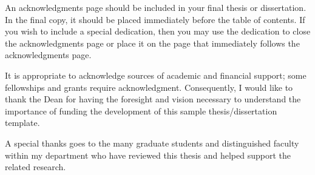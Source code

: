 \begin{singlespace}
\setcounter{page}{2}
\tableofcontents

\renewcommand{\listoftablespostscript}{

\textbf{Note:} Be consistent in aligning multi-lined table-names, figure-names,
and chapter/section-names throughout your document.  It is generally
recommended to make sure any additional lines (i.e., within a long title or a
long table name) wrap and align immediately under the 1st character of the
title or name with which they are associated in the line immediately above ---
as shown in the ``Table 2.1'' example above.   Whatever approach you take, be
consistent.}

\cleardoublepage
{}
{}
\listoffigures

\cleardoublepage
{}
{}
\listoftables
\end{singlespace}

\renewcommand{\thesisacknowledgmentpostscript}{
\textbf{Reminders of what needs to be updated:}
After removing these comments, use the above format to help input your
acknowledgments page.   A special dedication can be placed as the final
paragraph, as shown above; alternatively, you may include a special dedication
on the page that follows, as also shown in this sample template.}

\begin{thesisacknowledgments}
An acknowledgments page should be included in your final thesis or
dissertation.  In the final copy, it should be placed immediately before the
table of contents.  If you wish to include a special dedication, then you may
use the dedication to close the acknowledgments page or place it on the page
that immediately follows the acknowledgments page.  

It is appropriate to acknowledge sources of academic and financial support;
some fellowships and grants require acknowledgment.  Consequently, I would like
to thank the Dean for having the foresight and vision necessary to understand
the importance of funding the development of this sample thesis/dissertation
template.

A special thanks goes to the many graduate students and distinguished faculty
within my department who have reviewed this thesis and helped support the
related research.
\end{thesisacknowledgments}

